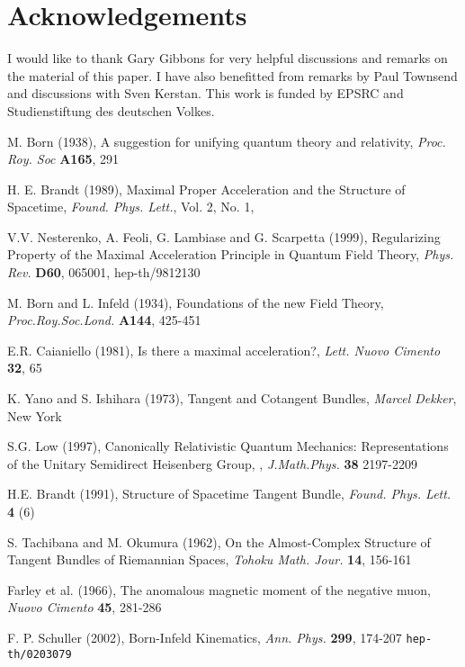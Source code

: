 \documentclass[11pt,a4paper,twoside]{article}
\begin{document}
\section*{Acknowledgements}
I would like to thank Gary Gibbons for very helpful discussions and
remarks on the material of this paper. I have also benefitted from
remarks by Paul Townsend and discussions with Sven Kerstan.
This work is funded by EPSRC and Studienstiftung des deutschen Volkes.


\begin{thebibliography}{00}
 M. Born (1938), A suggestion for unifying quantum
theory and relativity, \textit{Proc. Roy. Soc} \textbf{A165}, 291

 H. E. Brandt (1989), Maximal Proper Acceleration
and the Structure of Spacetime, \textit{Found. Phys. Lett.}, Vol. 2, No. 1,

V.V. Nesterenko, A. Feoli, G. Lambiase and G. Scarpetta (1999),
Regularizing Property of the Maximal Acceleration Principle in
Quantum Field Theory, \textit{Phys. Rev.} \textbf{D60}, 065001,
hep-th/9812130

 M. Born and L. Infeld (1934), Foundations of the new
Field Theory,
\textit{Proc.Roy.Soc.Lond.} \textbf{A144}, 425-451

 E.R. Caianiello (1981), Is there a maximal
acceleration?, \textsl{Lett. Nuovo Cimento} \textbf{32}, 65

 K. Yano and S. Ishihara (1973), Tangent and Cotangent
Bundles, \textit{Marcel Dekker}, New York

 S.G. Low (1997), Canonically Relativistic Quantum
Mechanics: Representations of the Unitary Semidirect Heisenberg Group,
\coordHE{}, \textit{J.Math.Phys.} \textbf{38} 2197-2209

 H.E. Brandt (1991), Structure of Spacetime Tangent
Bundle, \textit{Found. Phys. Lett.} \textbf{4} (6)

 S. Tachibana and M. Okumura (1962), On the
Almost-Complex Structure of Tangent Bundles of Riemannian Spaces,
\textit{Tohoku Math. Jour.} \textbf{14}, 156-161

 Farley et al. (1966), The anomalous magnetic moment
of the negative muon, \textit{Nuovo Cimento} \textbf{45}, 281-286

 F. P. Schuller (2002), Born-Infeld Kinematics,
\textit{Ann. Phys.} \textbf{299}, 174-207 {\tt hep-th/0203079}


\end{thebibliography}
\end{document}
